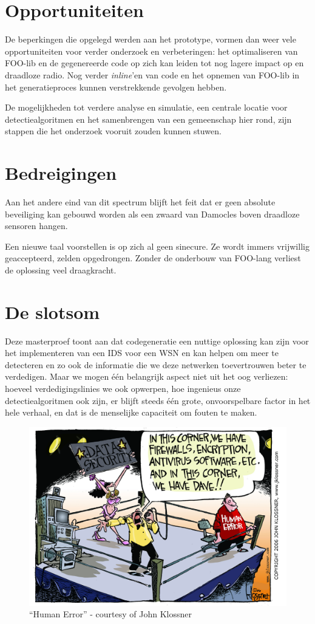 \section{Opportuniteiten}
\label{section:opportunities}

De beperkingen die opgelegd werden aan het prototype, vormen dan weer vele
opportuniteiten voor verder onderzoek en verbeteringen: het optimaliseren van
FOO-lib en de gegenereerde code op zich kan leiden tot nog lagere impact op
\mcu en draadloze radio. Nog verder \emph{inline}'en van code en het opnemen
van FOO-lib in het generatieproces kunnen verstrekkende gevolgen hebben.

De mogelijkheden tot verdere analyse en simulatie, een centrale locatie voor
detectiealgoritmen en het samenbrengen van een gemeenschap hier rond, zijn
stappen die het onderzoek vooruit zouden kunnen stuwen.

\vspace{-2mm}

\section{Bedreigingen}
\label{section:threaths}

Aan het andere eind van dit spectrum blijft het feit dat er geen absolute
beveiliging kan gebouwd worden als een zwaard van Damocles boven draadloze
sensoren hangen.

Een nieuwe taal voorstellen is op zich al geen sinecure. Ze wordt immers
vrijwillig geaccepteerd, zelden opgedrongen. Zonder de onderbouw van FOO-lang
verliest de oplossing veel draagkracht.

\vspace{-2mm}

\section{De slotsom}
\label{section:bottom-line}

Deze masterproef toont aan dat codegeneratie een nuttige oplossing kan zijn
voor het implementeren van een IDS voor een WSN en kan helpen om meer te
detecteren en zo ook de informatie die we deze netwerken toevertrouwen beter te
verdedigen. Maar we mogen \'e\'en belangrijk aspect niet uit het oog verliezen:
hoeveel verdedigingslinies we ook opwerpen, hoe ingenieus onze
detectiealgoritmen ook zijn, er blijft steeds \'e\'en grote, onvoorspelbare
factor in het hele verhaal, en dat is de menselijke capaciteit om fouten te
maken.

\begin{figure}[ht]
  \centering
  \includegraphics[width=0.72\linewidth]{resources/cartoon_human_error.jpg}
  \caption[``Human Error'']{``Human Error'' - courtesy of John Klossner}
\end{figure}
